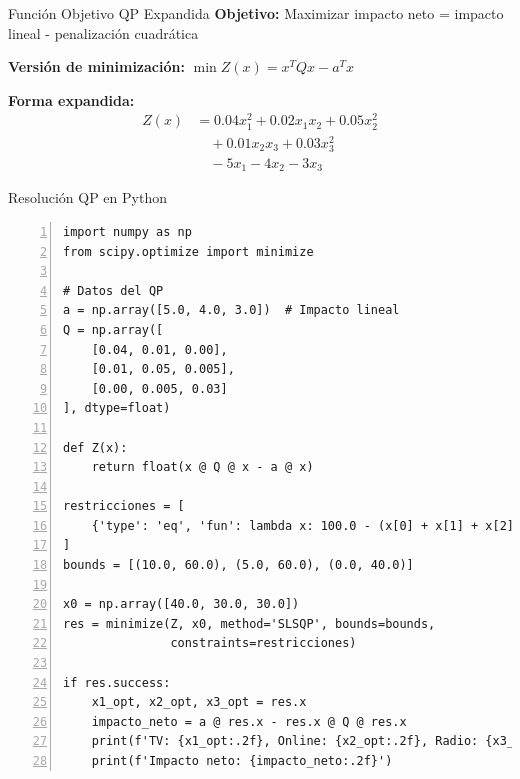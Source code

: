 \documentclass{beamer}
\begin{document}
\begin{frame}{Función Objetivo QP Expandida}
    \textbf{Objetivo:} Maximizar impacto neto = impacto lineal - penalización cuadrática
    
    \vspace{0.3cm}
    
    \textbf{Versión de minimización:} $\min Z(x) = x^T Q x - a^T x$
    
    \vspace{0.3cm}
    
    \textbf{Forma expandida:}
    \begin{align*}
    Z(x) &= 0.04x_1^2 + 0.02x_1x_2 + 0.05x_2^2 \\
         &\quad + 0.01x_2x_3 + 0.03x_3^2 \\
         &\quad - 5x_1 - 4x_2 - 3x_3
    \end{align*}
\end{frame}

\begin{frame}[fragile]{Resolución QP en Python}
    \begin{lstlisting}[numbers=left, numbersep=5pt]
import numpy as np
from scipy.optimize import minimize

# Datos del QP
a = np.array([5.0, 4.0, 3.0])  # Impacto lineal
Q = np.array([
    [0.04, 0.01, 0.00],
    [0.01, 0.05, 0.005],
    [0.00, 0.005, 0.03]
], dtype=float)

def Z(x):
    return float(x @ Q @ x - a @ x)

restricciones = [
    {'type': 'eq', 'fun': lambda x: 100.0 - (x[0] + x[1] + x[2])}
]
bounds = [(10.0, 60.0), (5.0, 60.0), (0.0, 40.0)]

x0 = np.array([40.0, 30.0, 30.0])
res = minimize(Z, x0, method='SLSQP', bounds=bounds, 
               constraints=restricciones)

if res.success:
    x1_opt, x2_opt, x3_opt = res.x
    impacto_neto = a @ res.x - res.x @ Q @ res.x
    print(f'TV: {x1_opt:.2f}, Online: {x2_opt:.2f}, Radio: {x3_opt:.2f}')
    print(f'Impacto neto: {impacto_neto:.2f}')
    \end{lstlisting}
\end{frame}
\end{document}
